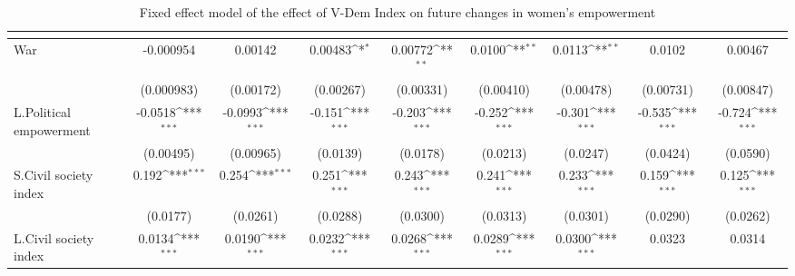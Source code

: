 \begin{table}[htbp]\centering
\def\sym#1{\ifmmode^{#1}\else\(^{#1}\)\fi}
\caption{Fixed effect model of the effect of V-Dem Index on future changes in women's empowerment \label{fepolempvdem}}
\begin{tabular}{l*{8}{c}}
\hline\hline
                    &&&&&&&&\\
\hline
War                 &   -0.000954         &     0.00142         &     0.00483\sym{*}  &     0.00772\sym{**} &      0.0100\sym{**} &      0.0113\sym{**} &      0.0102         &     0.00467         \\
                    &  (0.000983)         &   (0.00172)         &   (0.00267)         &   (0.00331)         &   (0.00410)         &   (0.00478)         &   (0.00731)         &   (0.00847)         \\
[1em]
L.Political empowerment&     -0.0518\sym{***}&     -0.0993\sym{***}&      -0.151\sym{***}&      -0.203\sym{***}&      -0.252\sym{***}&      -0.301\sym{***}&      -0.535\sym{***}&      -0.724\sym{***}\\
                    &   (0.00495)         &   (0.00965)         &    (0.0139)         &    (0.0178)         &    (0.0213)         &    (0.0247)         &    (0.0424)         &    (0.0590)         \\
[1em]
S.Civil society index&       0.192\sym{***}&       0.254\sym{***}&       0.251\sym{***}&       0.243\sym{***}&       0.241\sym{***}&       0.233\sym{***}&       0.159\sym{***}&       0.125\sym{***}\\
                    &    (0.0177)         &    (0.0261)         &    (0.0288)         &    (0.0300)         &    (0.0313)         &    (0.0301)         &    (0.0290)         &    (0.0262)         \\
[1em]
L.Civil society index&      0.0134\sym{***}&      0.0190\sym{***}&      0.0232\sym{***}&      0.0268\sym{***}&      0.0289\sym{***}&      0.0300\sym{***}&      0.0323         &      0.0314         \\

\end{tabular}
\end{table}

